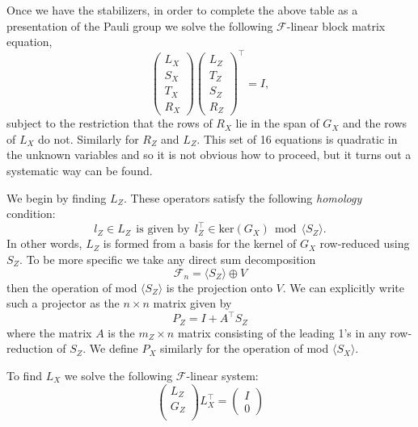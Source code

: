\documentclass[11pt,oneside]{article}
\def\Span#1{\langle #1 \rangle}
\def\smbox#1{\ \ \mbox{#1}\ \ }
\newcommand{\Field}{\mathcal{F}}
\def\Ker{\mathrm{ker}}
\def\Fnd{\Field_{n}}
\begin{document}
Once we have the stabilizers, in order to
complete the above table as a presentation
of the Pauli group we solve the
following $\Field$-linear block matrix equation,
$$
\left( \begin{array}{l}
L_X\\
S_X\\
T_X\\
R_X
\end{array} \right)
\left( \begin{array}{l}
L_Z\\
T_Z\\
S_Z\\
R_Z
\end{array} \right)^\top =
I,
$$
subject to the restriction that the rows of
$R_X$ lie in the span of $G_X$ and
the rows of $L_X$ do not.
Similarly for $R_Z$ and $L_Z.$
This set of 16 equations is quadratic in the unknown variables
and so it is not obvious how to proceed, but it turns out a
systematic way can be found.

We begin by finding $L_Z.$
These operators satisfy the following \emph{homology} condition:
$$
    l_Z \in L_Z \smbox{is given by} l_Z^\top \in \Ker(G_X) \smbox{mod} \Span{S_Z}.
$$
In other words, $L_Z$ is formed from a basis for the kernel of $G_X$ 
row-reduced using $S_Z.$
To be more specific %
we take any direct sum decomposition
$$\Fnd = \Span{S_Z} \oplus V$$
then the operation of mod $\Span{S_Z}$ is the
projection onto $V.$
We can explicitly write such a 
projector as the $n\times n$
matrix given by
$$
    P_Z = I + A^\top S_Z
$$
where the matrix $A$ is the $m_Z\times n$ matrix consisting of
the leading 1's in any row-reduction of $S_Z.$
We define $P_X$ similarly for the operation of mod $\Span{S_X}.$

To find $L_X$ we solve the following $\Field$-linear
system:
$$
\left( \begin{array}{l}
L_Z\\
G_Z\\
\end{array} \right)
L_X^\top = 
\left( \begin{array}{l}
I\\
0
\end{array} \right)
$$
\end{document}
